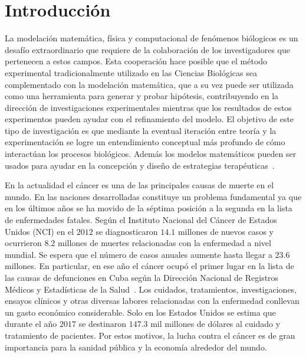\chapter{Introducci\'on} 
\label{sec-intro}
La modelaci\'on matem\'atica, f\'isica y computacional de fen\'omenos bi\'ologicos es un desaf\'io extraordinario que requiere de la colaboraci\'on de los investigadores que pertenecen a estos campos. Esta cooperaci\'on hace posible que el m\'etodo experimental tradicionalmente utilizado en las Ciencias Biol\'ogicas sea complementado con la modelaci\'on matem\'atica, que a su vez puede ser utilizada como una herramienta para generar y probar hip\'otesis, contribuyendo en la direcci\'on de investigaciones experimentales mientras que los resultados de estos experimentos pueden ayudar con el refinamiento del modelo. El objetivo de este tipo de investigaci\'on es que mediante la eventual iteraci\'on entre teor\'ia y la experimentaci\'on se logre un entendimiento conceptual m\'as profundo de c\'omo interact\'uan los procesos biol\'ogicos. Adem\'as los modelos matem\'aticos pueden ser usados para ayudar en la concepci\'on y dise\~no de estrategias terap\'euticas~\cite{bellomo}.

En la actualidad el c\'ancer es una de las principales causas de muerte en el mundo. En las naciones desarrolladas constituye un problema fundamental ya que en los \'ultimos a\~nos se ha movido de la s\'eptima posici\'on a la segunda en la lista de enfermedades fatales. Seg\'un el Instituto Nacional del C\'ancer de Estados Unidos (NCI) en el $2012$ se diagnosticaron $14.1$ millones de nuevos casos y ocurrieron $8$.$2$ millones de muertes relacionadas con la enfermedad a nivel mundial. Se espera que el n\'umero de casos anuales aumente hasta llegar a $23$.$6$ millones. En particular, en ese a\~no el c\'ancer ocup\'o el primer lugar en la lista de las causas de defunciones en Cuba seg\'un la Direcci\'on Nacional de Registros M\'edicos y Estad\'isticas de la Salud~\cite{ariel}. Los cuidados, tratamientos, investigaciones, ensayos cl\'inicos y otras diversas labores relacionadas con la enfermedad conllevan un gasto econ\'omico considerable. Solo en los Estados Unidos se estima que durante el a\~no $2017$ se destinaron $147.3$ mil millones de d\'olares al cuidado y tratamiento de pacientes. Por estos motivos, la lucha contra el c\'ancer es de gran importancia para la sanidad p\'ublica y la econom\'ia alrededor del mundo.

